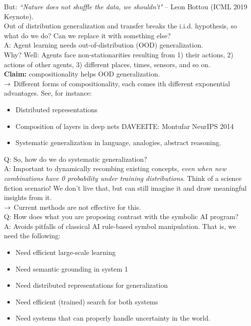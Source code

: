 But: {\it ``Nature does not shuffle the data, we shouldn't"}
-- Leon Bottou (ICML 2019 Keynote). \\

Out of distribution generalization and transfer breaks the i.i.d. hypothesis, so what do we do? Can we replace it with something else? \\

A: Agent learning needs out-of-distribution (OOD) generalization. \\


Why? Well: Agents face non-stationarities resulting from 1) their actions, 2) actions of other agents, 3) different places, times, sensors, and so on. \\

{\bf Claim:} compositionality helps OOD generalization. \\

$\rightarrow$ Different forms of compositionality, each comes ith different exponential advantages. See, for instance:
\begin{itemize}
    \item Distributed representations
    \item Composition of layers in deep nets DAVEEITE: Montufar NeurIPS 2014
    \item Systematic generalization in language, analogies, abstract reasoning.
\end{itemize}

Q: So, how do we do systematic generalization? \\

A: Important to dynamically recombing existing concepts, {\it even when new combinations have 0 probability under training distributions}. Think of a science fiction scenario! We don't live that, but can still imagine it and draw meaningful insights from it. \\

$\rightarrow$ Current methods are not effective for this. \\

Q: How does what you are proposing contrast with the symbolic AI program? \\

A: Avoids pitfalls of classical AI rule-based symbol manipulation. That is, we need the following:
\begin{itemize}
    \item Need efficient large-scale learning
    \item Need semantic grounding in system 1
    \item Need distributed representations for generalization
    \item Need efficient (trained) search for both systems
    \item Need systems that can properly handle uncertainty in the world.
\end{itemize}

